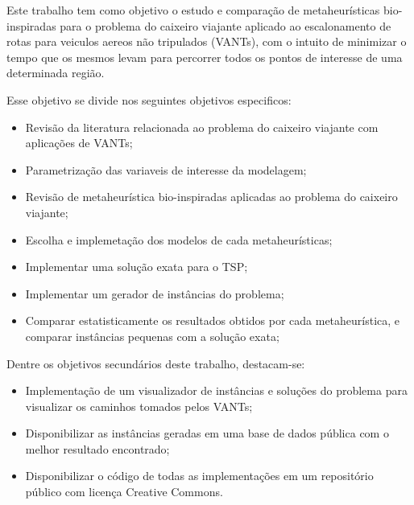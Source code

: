 \documentclass[
	12pt,				%
	openright,			%
	oneside,			%
	a4paper,			%
	chapter=TITLE,		%
	subsection=TITLE,	%
	english,			%
	brazil,				%
	]{abntex2}
\begin{document}
Este trabalho tem como objetivo o estudo e comparação de metaheurísticas bio-inspiradas para o problema do caixeiro viajante aplicado ao escalonamento de rotas para veiculos aereos não tripulados (VANTs), com o intuito de minimizar o tempo que os mesmos levam para percorrer todos os pontos de interesse de uma determinada região.

Esse objetivo se divide nos seguintes objetivos especificos: \begin{itemize}
	\item Revisão  da literatura relacionada ao problema do caixeiro viajante com aplicações de VANTs;
	\item Parametrização das variaveis de interesse da modelagem;
	\item Revisão de metaheurística bio-inspiradas aplicadas ao problema do caixeiro viajante;
	\item Escolha e implemetação dos modelos de cada metaheurísticas;
	\item Implementar uma solução exata para o TSP;
	\item Implementar um gerador de instâncias do problema;
	\item Comparar estatisticamente os resultados obtidos por cada metaheurística, e comparar instâncias pequenas com a solução exata;
\end{itemize}

Dentre os objetivos secundários deste trabalho, destacam-se: \begin{itemize}
	\item Implementação de um visualizador de instâncias e soluções do problema para visualizar os caminhos tomados pelos VANTs;
	\item Disponibilizar as instâncias geradas em uma base de dados pública com o melhor resultado encontrado;
	\item Disponibilizar o código de todas as implementações em um repositório público com licença Creative Commons.
\end{itemize}

%


\end{document}
